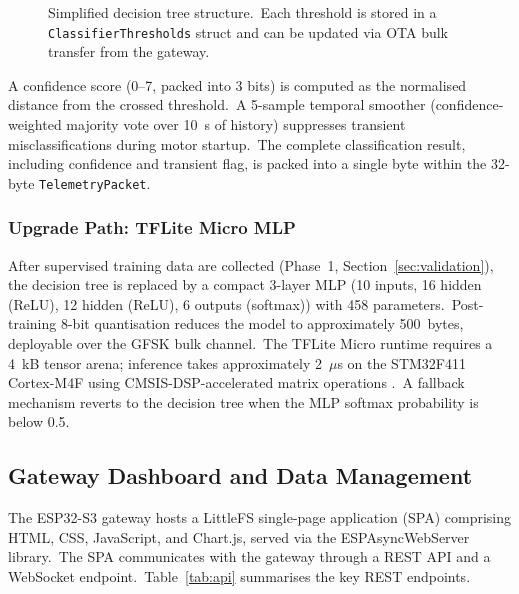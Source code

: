 \documentclass[conference]{IEEEtran}
\begin{document}
\begin{figure}[t]
  \centering
  \caption{Simplified decision tree structure.\ Each threshold is
    stored in a \texttt{ClassifierThresholds} struct and can be updated
    via OTA bulk transfer from the gateway.}
  \label{fig:dtree}
\end{figure}

A confidence score (0--7, packed into 3 bits) is computed as the
normalised distance from the crossed threshold.\ A 5-sample temporal
smoother (confidence-weighted majority vote over 10~s of history)
suppresses transient misclassifications during motor startup.\ The
complete classification result, including confidence and transient
flag, is packed into a single byte within the 32-byte
\texttt{TelemetryPacket}.

\subsubsection{Upgrade Path: TFLite Micro MLP}

After supervised training data are collected (Phase~1, Section~\ref{sec:validation}),
the decision tree is replaced by a compact 3-layer MLP (10 inputs,
16 hidden (ReLU), 12 hidden (ReLU), 6 outputs (softmax)) with 458
parameters.\ Post-training 8-bit quantisation reduces the model to
approximately 500~bytes, deployable over the GFSK bulk channel.\ The
TFLite Micro runtime requires a 4~kB tensor arena; inference takes
approximately 2~\(\mu\)s on the STM32F411 Cortex-M4F using
CMSIS-DSP-accelerated matrix operations \cite{arm_cmsis_dsp,
warden_tinyml_2019}.\ A fallback mechanism reverts to the decision
tree when the MLP softmax probability is below 0.5.

\subsection{Gateway Dashboard and Data Management}
\label{ssec:gateway}

The ESP32-S3 gateway hosts a LittleFS single-page application (SPA)
comprising HTML, CSS, JavaScript, and Chart.js, served via the
ESPAsyncWebServer library.\ The SPA communicates with the gateway
through a REST API and a WebSocket endpoint.\ Table~\ref{tab:api}
summarises the key REST endpoints.
\end{document}

